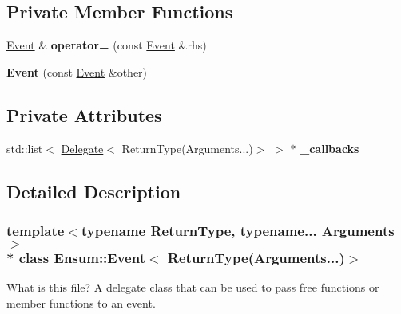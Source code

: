 \subsection*{Private Member Functions}
\begin{DoxyCompactItemize}
\item 
\hyperlink{class_ensum_1_1_event}{Event} \& {\bfseries operator=} (const \hyperlink{class_ensum_1_1_event}{Event} \&rhs)\hypertarget{class_ensum_1_1_event_3_01_return_type_07_arguments_8_8_8_08_4_ae4e35cd8a4fef4f6532cc4d25a852d01}{}\label{class_ensum_1_1_event_3_01_return_type_07_arguments_8_8_8_08_4_ae4e35cd8a4fef4f6532cc4d25a852d01}

\item 
{\bfseries Event} (const \hyperlink{class_ensum_1_1_event}{Event} \&other)\hypertarget{class_ensum_1_1_event_3_01_return_type_07_arguments_8_8_8_08_4_aa65f84516d6dda8f6a5036a0f0a114f3}{}\label{class_ensum_1_1_event_3_01_return_type_07_arguments_8_8_8_08_4_aa65f84516d6dda8f6a5036a0f0a114f3}

\end{DoxyCompactItemize}
\subsection*{Private Attributes}
\begin{DoxyCompactItemize}
\item 
std\+::list$<$ \hyperlink{class_ensum_1_1_delegate}{Delegate}$<$ Return\+Type(Arguments...)$>$ $>$ $\ast$ {\bfseries \+\_\+callbacks}\hypertarget{class_ensum_1_1_event_3_01_return_type_07_arguments_8_8_8_08_4_a9d2ecb32fbc73454985d470c673336a9}{}\label{class_ensum_1_1_event_3_01_return_type_07_arguments_8_8_8_08_4_a9d2ecb32fbc73454985d470c673336a9}

\end{DoxyCompactItemize}


\subsection{Detailed Description}
\subsubsection*{template$<$typename Return\+Type, typename... Arguments$>$\\*
class Ensum\+::\+Event$<$ Return\+Type(\+Arguments...)$>$}

What is this file? A delegate class that can be used to pass free functions or member functions to an event. 

